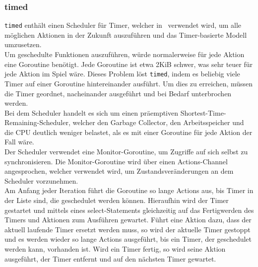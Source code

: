 \subsubsection{timed}
\verb+timed+ enthält einen Scheduler für Timer, welcher in \vires\ verwendet wird, um alle möglichen Aktionen in der Zukunft auszuführen und das Timer-basierte Modell umzusetzen. \\
Um geschedulte Funktionen auszuführen, würde normalerweise für jede Aktion eine Goroutine benötigt. Jede Goroutine ist etwa 2KiB schwer, was sehr teuer für jede Aktion im Spiel wäre. Dieses Problem löst \verb+timed+, indem es beliebig viele Timer auf einer Goroutine hintereinander ausführt. Um dies zu erreichen, müssen die Timer geordnet, nacheinander ausgeführt und bei Bedarf unterbrochen werden. \\
Bei dem Scheduler handelt es sich um einen präemptiven Shortest-Time-Remaining-Scheduler, welcher den Garbage Collector, den Arbeitsspeicher und die CPU deutlich weniger belastet, als es mit einer Goroutine für jede Aktion der Fall wäre. \\
Der Scheduler verwendet eine Monitor-Goroutine, um Zugriffe auf sich selbst zu synchronisieren. Die Monitor-Goroutine wird über einen Actions-Channel angesprochen, welcher verwendet wird, um Zustandsveränderungen an dem Scheduler vorzunehmen. \\
Am Anfang jeder Iteration führt die Goroutine so lange Actions aus, bis Timer in der Liste sind, die geschedulet werden können. Hieraufhin wird der Timer gestartet und mittels eines select-Statements gleichzeitig auf das Fertigwerden des Timers und Aktionen zum Ausführen gewartet. Führt eine Aktion dazu, dass der aktuell laufende Timer ersetzt werden muss, so wird der aktuelle Timer gestoppt und es werden wieder so lange Actions ausgeführt, bis ein Timer, der geschedulet werden kann, vorhanden ist. Wird ein Timer fertig, so wird seine Aktion ausgeführt, der Timer entfernt und auf den nächsten Timer gewartet.